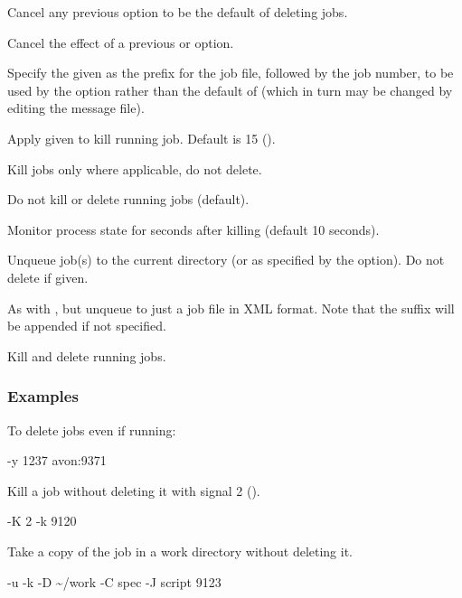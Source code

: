 
Cancel any previous  option to be the default of deleting jobs.


Cancel the effect of a previous  or  option.


Specify the given  as the prefix for the job file, followed by the job number, to be used by the
 option rather than the default of  (which in turn may be changed by editing the
message file).


Apply  given to kill running job. Default is 15 ().


Kill jobs only where applicable, do not delete.


Do not kill or delete running jobs (default).


Monitor process state for  seconds after killing (default 10 seconds).


Unqueue job(s) to the current directory (or as specified by the  option). Do not delete if  given.


As with , but unqueue to just a job file in XML format. Note that the suffix \batchjobsuffix{} will be appended if not specified.


Kill and delete running jobs.


\subsubsection{Examples}
To delete jobs even if running:

\begin{expara}

\BtjdelName{} -y 1237 avon:9371

\end{expara}

Kill a job without deleting it with signal 2
().

\begin{expara}

\BtjdelName{} -K 2 -k 9120

\end{expara}

Take a copy of the job in a work directory without deleting it.

\begin{expara}

\BtjdelName{} -u -k -D \~{}/work -C spec -J script 9123

\end{expara}


